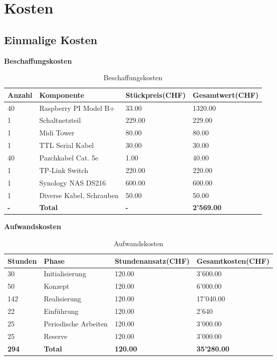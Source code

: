 
\section{Kosten}

\subsection{Einmalige Kosten}
\textbf{Beschaffungskosten}
\begin{table}[H]
\centering
\begin{tabular}{p{2cm}p{5cm}p{4cm}p{4cm}}
\hline
\rowcolor{heading} \textbf{Anzahl} & \textbf{Komponente} & \textbf{Stückpreis(CHF)} &\textbf{Gesamtwert(CHF)} \\\hline
40 & Raspberry PI Model B+ & 33.00 & 1320.00 \\\hline
1 & Schaltnetzteil & 229.00 & 229.00 \\\hline
1 & Midi Tower & 80.00 & 80.00 \\\hline
1 & TTL Serial Kabel & 30.00 & 30.00 \\\hline
40 & Pazchkabel Cat. 5e & 1.00 & 40.00 \\\hline
1 & TP-Link Switch & 220.00 & 220.00 \\\hline
1 & Synology NAS DS216 & 600.00 & 600.00 \\\hline
1 & Diverse Kabel, Schrauben & 50.00 & 50.00 \\\hline
\rowcolor{subheading}\textbf{-} & \textbf{Total} & \textbf{-} & \textbf{2'569.00} \\\hline
\end{tabular}
\caption{Beschaffungskosten}
\end{table}

\textbf{Aufwandskosten}
\begin{table}[H]
\centering
\begin{tabular}{p{2cm}p{5cm}p{4cm}p{4cm}}
\hline
\rowcolor{heading} \textbf{Stunden} & \textbf{Phase} & \textbf{Stundenansatz(CHF)} &\textbf{Gesamtkosten(CHF)} \\\hline
30 & Initialisierung & 120.00 & 3'600.00 \\\hline
50 & Konzept & 120.00 & 6'000.00 \\\hline
142 & Realisierung & 120.00 & 17'040.00 \\\hline
22 & Einführung & 120.00 & 2'640 \\\hline
25 & Periodische Arbeiten & 120.00 & 3'000.00 \\\hline
25 & Reserve & 120.00 & 3'000.00 \\\hline
\rowcolor{subheading}\textbf{294} & \textbf{Total} & \textbf{120.00} & \textbf{35'280.00} \\\hline
\end{tabular}
\caption{Aufwandskosten}
\end{table}

